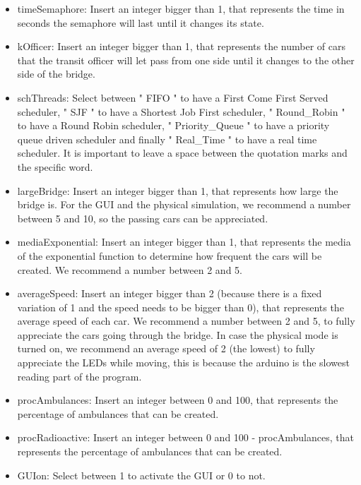 \documentclass[a4paper,9pt]{article}
\begin{document}
\begin{enumerate}
\begin{itemize}
\item timeSemaphore: Insert an integer bigger than 1, that represents the time in seconds the semaphore will last until it changes its state. 

\item kOfficer: Insert an integer bigger than 1, that represents the number of cars that the transit officer will let pass from one side until it changes to the other side of the bridge.

\item schThreads: Select between " FIFO " to have a First Come First Served scheduler, " SJF " to have a Shortest Job First scheduler, " Round\_Robin " to have a Round Robin scheduler, " Priority\_Queue " to have a priority queue driven scheduler and finally " Real\_Time " to have a real time scheduler. It is important to leave a space between the quotation marks and the specific word.

\item largeBridge: Insert an integer bigger than 1, that represents how large the bridge is. For the GUI and the physical simulation, we recommend a number between 5 and 10, so the passing cars can be appreciated. 

\item mediaExponential: Insert an integer bigger than 1, that represents the media of the exponential function to determine how frequent the cars will be created. We recommend a number between 2 and 5.

\item averageSpeed: Insert an integer bigger than 2 (because there is a fixed variation of 1 and the speed needs to be bigger than 0), that represents the average speed of each car. We recommend a number between 2 and 5, to fully appreciate the cars going through the bridge. In case the physical mode is turned on, we recommend an average speed of 2 (the lowest) to fully appreciate the LEDs while moving, this is because the arduino is the slowest reading part of the program. 

\item procAmbulances: Insert an integer between 0 and 100, that represents the percentage of ambulances that can be created.

\item procRadioactive: Insert an integer between 0 and 100 - procAmbulances, that represents the percentage of ambulances that can be created.

\item GUIon: Select between 1 to activate the GUI or 0 to not.


\end{itemize}
\end{enumerate}
\end{document}
